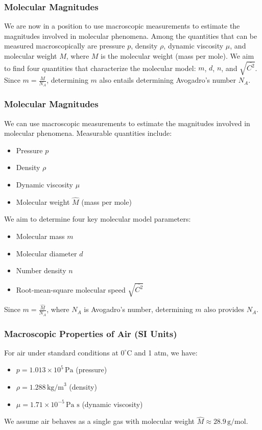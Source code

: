 \documentclass{beamer}
\begin{document}
\begin{frame}
\frametitle{Molecular Magnitudes}

We are now in a position to use macroscopic measurements to estimate the magnitudes involved in molecular phenomena. Among the quantities that can be measured macroscopically are pressure $p$, density $\rho$, dynamic viscosity $\mu$, and molecular weight $M$, where $M$ is the molecular weight (mass per mole). We aim to find four quantities that characterize the molecular model: $m$, $d$, $n$, and $\sqrt{\overline{C^2}}$. Since $m = \frac{M}{N_A}$, determining $m$ also entails determining Avogadro's number $N_A$.
\end{frame}

\begin{frame}
\frametitle{Molecular Magnitudes}

We can use macroscopic measurements to estimate the magnitudes involved in molecular phenomena. Measurable quantities include:
\begin{itemize}
    \item Pressure $p$
    \item Density $\rho$
    \item Dynamic viscosity $\mu$
    \item Molecular weight $\hat{M}$ (mass per mole)
\end{itemize}

We aim to determine four key molecular model parameters:
\begin{itemize}
    \item Molecular mass $m$
    \item Molecular diameter $d$
    \item Number density $n$
    \item Root-mean-square molecular speed $\sqrt{\overline{C^2}}$
\end{itemize}

Since $m = \frac{\hat{M}}{N_A}$, where $N_A$ is Avogadro's number, determining $m$ also provides $N_A$.
\end{frame}

\begin{frame}
\frametitle{Macroscopic Properties of Air (SI Units)}

For air under standard conditions at $0^\circ$C and 1 atm, we have:
\begin{itemize}
    \item $p = 1.013 \times 10^5 \, \text{Pa}$ (pressure)
    \item $\rho = 1.288 \, \text{kg/m}^3$ (density)
    \item $\mu = 1.71 \times 10^{-5} \, \text{Pa s}$ (dynamic viscosity)
\end{itemize}

We assume air behaves as a single gas with molecular weight $\hat{M} \approx 28.9 \, \text{g/mol}$.
\end{frame}
\end{document}
